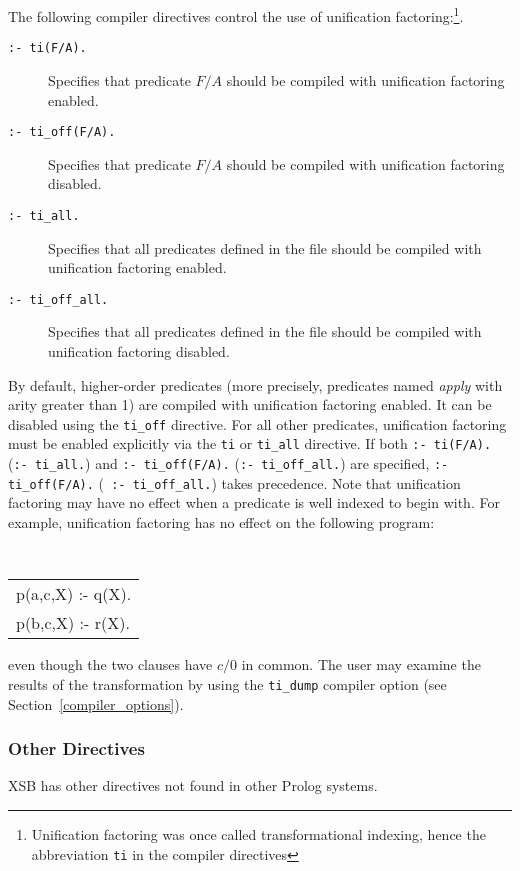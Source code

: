 The following compiler directives control the use of unification
factoring:\footnote{Unification factoring was once called
transformational indexing, hence the abbreviation {\tt ti} in the
compiler directives}.
\begin{description}
\item[{\tt :- ti(F/A).}] Specifies that predicate $F/A$ should be
	compiled with unification factoring enabled.
\item[{\tt :- ti\_off(F/A).}] Specifies that predicate $F/A$ should be
	compiled with unification factoring disabled.
\item[{\tt :- ti\_all.}] Specifies that all predicates defined in the
	file should be compiled with unification factoring enabled.
\item[{\tt :- ti\_off\_all.}] Specifies that all predicates defined in
	the file should be compiled with unification factoring disabled.
\end{description}
By default, higher-order predicates (more precisely, predicates named
{\it apply\/} with arity greater than 1) are compiled with unification
factoring enabled.  It can be disabled using the {\tt ti\_off}
directive.  For all other predicates, unification factoring must be
enabled explicitly via the {\tt ti} or {\tt ti\_all} directive.  If
both {\tt :- ti(F/A).} ({\tt :- ti\_all.}) and {\tt :- ti\_off(F/A).}
({\tt :- ti\_off\_all.}) are specified, {\tt :- ti\_off(F/A).} ({\tt
:- ti\_off\_all.}) takes precedence.  Note that unification factoring
may have no effect when a predicate is well indexed to begin
with.  For example, unification factoring has no effect on the
following program:
\begin{center}
\tt
\begin{tabular}{l}
p(a,c,X) :- q(X). \\
p(b,c,X) :- r(X).
\end{tabular}
\end{center}
even though the two clauses have $c/0$ in common.  The user may
examine the results of the transformation by using the {\tt ti\_dump}
compiler option (see Section~\ref{compiler_options}).

\subsubsection{Other Directives} \label{other-directives}

XSB has other directives not found in other Prolog systems.

